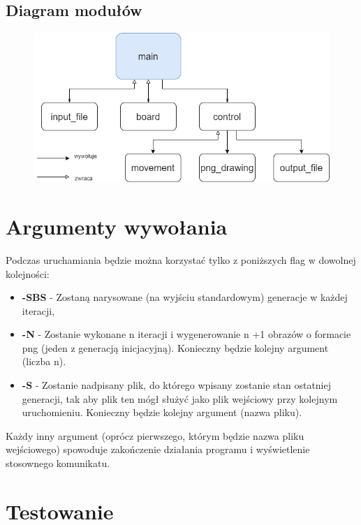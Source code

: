 \documentclass{article}
\begin{document}
\subsection{Diagram modułów}
\begin{figure} [hbt!]
    \centering
    \includegraphics[width=12cm]{Untitled Diagram.png}
\end{figure}


\newpage

\section{Argumenty wywołania}

Podczas uruchamiania będzie można korzystać tylko z poniższych flag w dowolnej kolejności:
\begin{itemize}
    \item \textbf{-SBS} 
    - Zostaną narysowane (na wyjściu standardowym) generacje w każdej iteracji,  
    \item \textbf{-N}
    - Zostanie wykonane n iteracji i wygenerowanie n +1 obrazów o formacie png (jeden z generacją inicjacyjną). Konieczny będzie kolejny argument (liczba n).
    \item \textbf{-S}
    - Zostanie nadpisany plik, do którego wpisany zostanie stan ostatniej generacji, tak aby plik ten mógł służyć jako plik wejściowy przy kolejnym uruchomieniu. Konieczny będzie kolejny argument (nazwa pliku).
\end{itemize}
Każdy inny argument (oprócz pierwszego, którym będzie nazwa pliku wejściowego) spowoduje zakończenie działania programu i wyświetlenie stosownego komunikatu.

\section{Testowanie}
\end{document}
